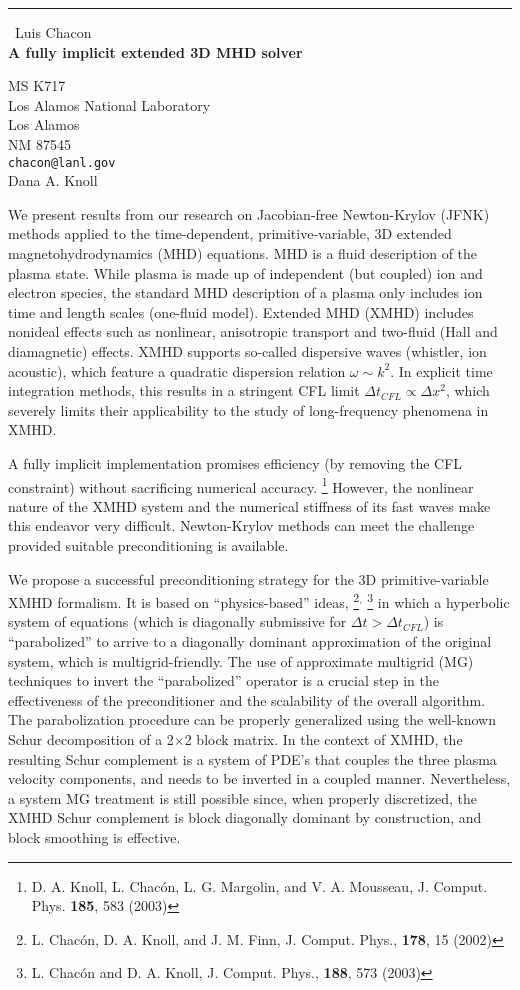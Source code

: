 \documentclass{report}
\begin{document}
\begin{center}
\rule{6in}{1pt} \
{\large Luis Chacon \\
{\bf A fully implicit extended 3D MHD solver}}

MS K717 \\ Los Alamos National Laboratory \\ Los Alamos \\ NM 87545
\\
{\tt chacon@lanl.gov}\\
Dana A. Knoll\end{center}

We present results from our research on Jacobian-free Newton-Krylov
(JFNK) methods applied to the time-dependent, primitive-variable,
3D extended magnetohydrodynamics (MHD) equations. MHD is a fluid description
of the plasma state. While plasma is made up of independent (but coupled)
ion and electron species, the standard MHD description of a plasma
only includes ion time and length scales (one-fluid model). Extended
MHD (XMHD) includes nonideal effects such as nonlinear, anisotropic
transport and two-fluid (Hall and diamagnetic) effects. XMHD supports
so-called dispersive waves (whistler, ion acoustic), which feature
a quadratic dispersion relation $\omega \sim k^{2}$. In explicit
time integration methods, this results in a stringent CFL limit $\Delta
t_{CFL}\propto \Delta x^{2}$,
which severely limits their applicability to the study of long-frequency
phenomena in XMHD.

A fully implicit implementation promises efficiency (by removing the
CFL constraint) without sacrificing numerical accuracy.%
\footnote{D. A. Knoll, L. Chac\'{o}n, L. G. Margolin, and V. A. Mousseau, J.
Comput. Phys. \textbf{185}, 583 (2003)
} However, the nonlinear nature of the XMHD system and the numerical
stiffness of its fast waves make this endeavor very difficult. Newton-Krylov
methods can meet the challenge provided suitable preconditioning is
available.

We propose a successful preconditioning strategy for the 3D primitive-variable
XMHD formalism. It is based on {}``physics-based'' ideas,%
\footnote{L. Chac\'{o}n, D. A. Knoll, and J. M. Finn, J. Comput. Phys., \textbf{178},
15 (2002)%
}$^{,}$%
\footnote{L. Chac\'{o}n and D. A. Knoll, J. Comput. Phys., \textbf{188}, 573
(2003)
} in which a hyperbolic system of equations (which is diagonally submissive
for $\Delta t>\Delta t_{CFL}$) is {}``parabolized'' to arrive to
a diagonally dominant approximation of the original system, which
is multigrid-friendly. The use of approximate multigrid (MG) techniques
to invert the {}``parabolized'' operator is a crucial step in the
effectiveness of the preconditioner and the scalability of the overall
algorithm. The parabolization procedure can be properly generalized
using the well-known Schur decomposition of a 2$\times $2 block matrix.
In the context of XMHD, the resulting Schur complement is a system
of PDE's that couples the three plasma velocity components, and needs
to be inverted in a coupled manner. Nevertheless, a system MG treatment
is still possible since, when properly discretized, the XMHD Schur
complement is block diagonally dominant by construction, and block
smoothing is effective.
\end{document}
